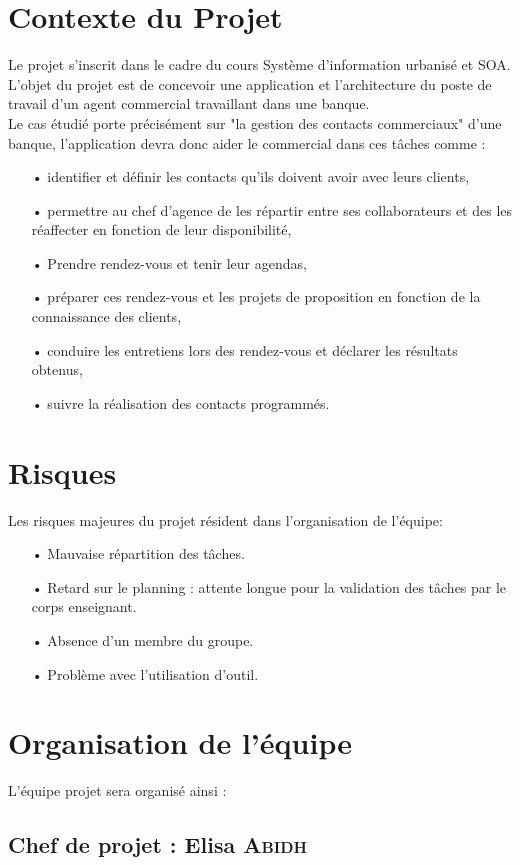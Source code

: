 \section{Contexte du Projet}
Le projet s'inscrit dans le cadre du cours Système d'information urbanisé et SOA.
L'objet du projet est de concevoir une application et l'architecture du poste de travail d'un agent commercial travaillant dans une banque. \\
Le cas étudié porte précisément sur "la gestion des contacts commerciaux" d'une banque, l'application devra donc aider le commercial dans ces tâches comme :
\begin{itemize}
\item[•]identifier et définir les contacts qu'ils doivent avoir avec leurs clients,
\item[•]permettre au chef d'agence de les répartir entre ses collaborateurs et des les réaffecter en fonction de leur disponibilité,
\item[•]Prendre rendez-vous et tenir leur agendas,
\item[•]préparer ces rendez-vous et les projets de proposition en fonction de la connaissance des clients,
\item[•]conduire les entretiens lors des rendez-vous et déclarer les résultats obtenus,
\item[•]suivre la réalisation des contacts programmés.
\end{itemize}  

\section{Risques}
Les risques majeures du projet résident dans l'organisation de l'équipe: 
\begin{itemize}
\item[•]Mauvaise répartition des tâches.
\item[•]Retard sur le planning : attente longue pour la validation des tâches par le corps enseignant.
\item[•]Absence d'un membre du groupe.
\item[•]Problème avec l'utilisation d'outil.
\end{itemize}
\section{Organisation de l'équipe}
L'équipe projet sera organisé ainsi :
\subsection{Chef de projet : Elisa \textsc{Abidh}}

